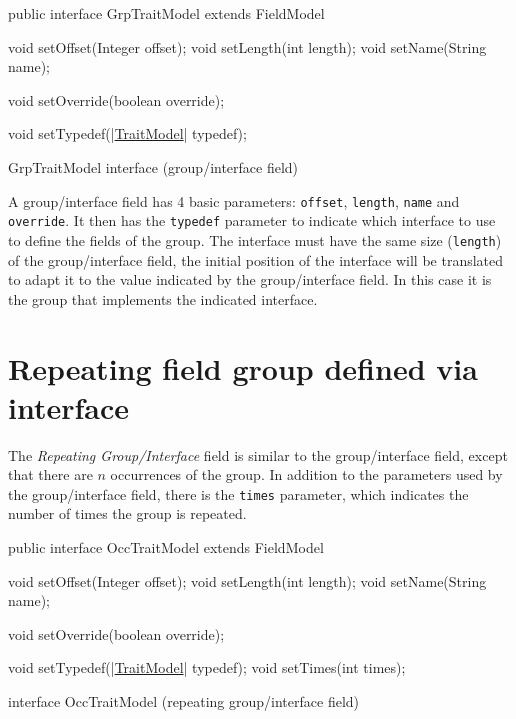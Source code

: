 \begin{elisting}[!htb]
\begin{javacode}
public interface GrpTraitModel extends FieldModel {
    void setOffset(Integer offset);
    void setLength(int length);
    void setName(String name);
    
    void setOverride(boolean override);
    
    void setTypedef(|\hyperref[lst:TraitModel]{TraitModel}| typedef);
}
\end{javacode}
\caption{GrpTraitModel interface (group/interface field)}
\label{lst:GrpTraitModel}
\end{elisting}

A group/interface field has 4 basic parameters: \verb!offset!, \verb!length!, 
\verb!name! and \verb!override!. It then has the \verb!typedef! parameter to 
indicate which interface to use to define the fields of the group. 
The interface must have the same size (\verb!length!) of the group/interface 
field, the initial position of the interface will be translated to adapt it to 
the value indicated by the group/interface field. 
In this case it is the group that implements the indicated interface.


\section{Repeating field group defined via interface}
The \textsl{Repeating Group/Interface} field is similar to the group/interface 
field, except that there are $n$ occurrences of the group. 
In addition to the parameters used by the group/interface field, there is the 
\verb!times! parameter, which indicates the number of times the group is 
repeated.

\begin{elisting}[!htb]
\begin{javacode}
public interface OccTraitModel extends FieldModel {
    void setOffset(Integer offset);
    void setLength(int length);
    void setName(String name);
    
    void setOverride(boolean override);
    
    void setTypedef(|\hyperref[lst:TraitModel]{TraitModel}| typedef);
    void setTimes(int times);
}
\end{javacode}
\caption{interface OccTraitModel (repeating group/interface field)}
\label{lst:OccTraitModel}
\end{elisting}

